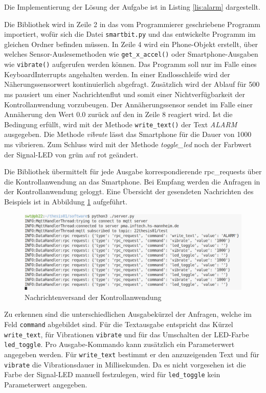 \documentclass[11pt,a4paper]{report}
\begin{document}
Die Implementierung der Lösung der Aufgabe ist in Listing \ref{lis:alarm} dargestellt.
\lstset{language=python, captionpos=b, frame=single, numberstyle=\tiny, style=customcs}

Die Bibliothek wird in Zeile 2 in das vom Programmierer geschriebene Programm importiert, wofür sich die Datei \texttt{smartbit.py} und das entwickelte Programm im gleichen Ordner befinden müssen.
In Zeile 4 wird ein Phone-Objekt erstellt, über welches Sensor-Auslesemethoden wie \texttt{get\_x\_accel()} oder Smartphone-Ausgaben wie \texttt{vibrate()} aufgerufen werden können.
Das Programm soll nur im Falle eines KeyboardInterrupts angehalten werden.
In einer Endlosschleife wird der Näherungssensorwert kontinuierlich abgefragt.
Zusätzlich wird der Ablauf für 500 ms pausiert um einer Nachrichtenflut und somit einer Nichtverfügbarkeit der Kontrollanwendung vorzubeugen.
Der Annäherungssensor sendet im Falle einer Annäherung den Wert 0.0 zurück auf den in Zeile 8 reagiert wird.
Ist die Bedingung erfüllt, wird mit der Methode \texttt{write\_text()} der Text \textit{ALARM} ausgegeben.
Die Methode \textit{vibrate} lässt das Smartphone für die Dauer von 1000 ms vibrieren.
Zum Schluss wird mit der Methode \textit{toggle\_led} noch der Farbwert der Signal-LED von grün auf rot geändert.

Die Bibliothek übermittelt für jede Ausgabe korrespondierende rpc\_requests über die Kontrollanwendung an das Smartphone.
Bei Empfang werden die Anfragen in der Kontrollanwendung geloggt.
Eine Übersicht der gesendeten Nachrichten des Beispiels ist in Abbildung \ref{fig:req_controll_app} aufgeführt.
\begin{figure}[htbp]
  \centering
  \includegraphics[width=\textwidth]{images/server_requests}
  \caption{Nachrichtenversand der Kontrollanwendung}
  \label{fig:req_controll_app}
\end{figure}
Zu erkennen sind die unterschiedlichen Ausgabekürzel der Anfragen, welche im Feld \texttt{command} abgebildet sind.
Für die Textausgabe entspricht das Kürzel \texttt{write\_text}, für Vibrationen \texttt{vibrate} und für das Umschalten der LED-Farbe \texttt{led\_toggle}.
Pro Ausgabe-Kommando kann zusätzlich ein Parameterwert angegeben werden.
Für \texttt{write\_text} bestimmt er den anzuzeigenden Text und für \texttt{vibrate} die Vibrationsdauer in Millisekunden.
Da es nicht vorgesehen ist die Farbe der Signal-LED manuell festzulegen, wird für \texttt{led\_toggle} kein Parameterwert angegeben.
\end{document}
